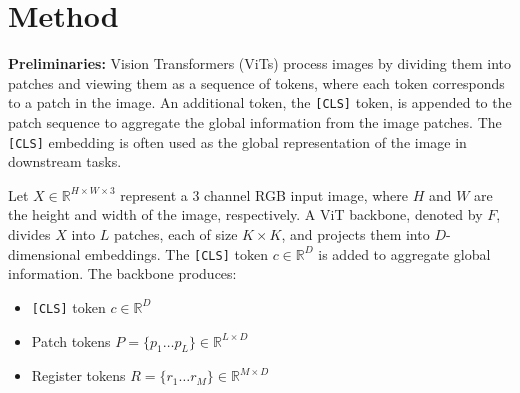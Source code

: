 \section{Method}



\noindent\textbf{Preliminaries:}
Vision Transformers (ViTs) process images by dividing them into patches and viewing them as a sequence of tokens, where each token corresponds to a patch in the image. An additional token, the \texttt{[CLS]} token, is appended to the patch sequence to aggregate the global information from the image patches. The \texttt{[CLS]} embedding is often used as the global representation of the image in downstream tasks. %

Let $X \in \mathbb{R}^{H \times W \times 3}$ represent a $3$ channel RGB input image, where $H$ and $W$ are the height and width of the image, respectively. A ViT backbone, denoted by $F$, divides $X$ into $L$ patches, each of size $K \times K$, and projects them into $D$-dimensional embeddings. The \texttt{[CLS]} token $c \in \mathbb{R}^D$ is added to aggregate global information. The backbone produces:  

\begin{itemize}
    \item \texttt{[CLS]} token $c \in \mathbb{R}^D$
    \item Patch tokens $P = \{p_1 \ldots p_L \} \in \mathbb{R}^{L \times D} $
    \item Register tokens $R = \{r_1 \ldots r_M \} \in \mathbb{R}^{M \times D}$
\end{itemize}


